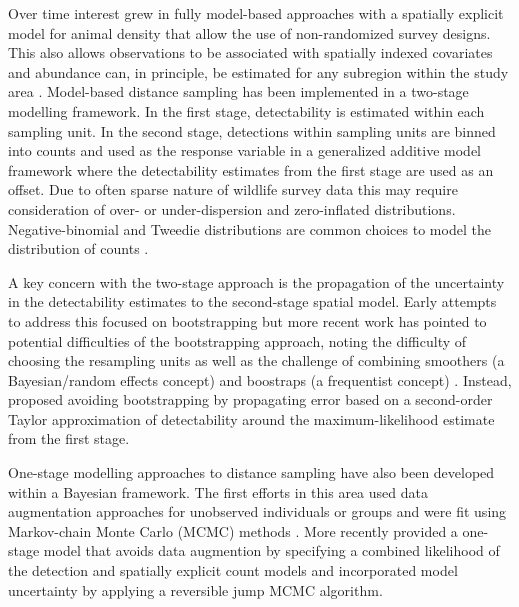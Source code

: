 \documentclass[preprint,12pt]{elsarticle}
\begin{document}
Over time interest grew in fully model-based approaches with a spatially explicit model for animal density that allow the use of non-randomized survey designs.  This also allows observations to be associated with spatially indexed covariates and abundance can, in principle, be estimated for any subregion within the study area \citep{johnson_model-based_2010, miller_spatial_2013, buckland_model-based_2016}.  
Model-based distance sampling has been implemented in a two-stage modelling framework.  In the first stage, detectability is estimated within each sampling unit.  In the second stage, detections within sampling units are binned into counts and used as the response variable in a generalized additive model framework where the detectability estimates from the first stage are used as an offset.  Due to often sparse nature of wildlife survey data this may require consideration of over- or under-dispersion and zero-inflated distributions.  Negative-binomial and Tweedie distributions are common choices to model the distribution of counts \citep{wood_gam_2017}.

A key concern with the two-stage approach is the propagation of the uncertainty in the detectability estimates to the second-stage spatial model.  Early attempts to address this focused on bootstrapping \citep{lahiri_resampling_2003, hedley_spatial_2004} but more recent work has pointed to potential difficulties of the bootstrapping approach, noting the difficulty of choosing the resampling units as well as the challenge of combining smoothers (a Bayesian/random effects concept) and boostraps (a frequentist concept) \citep{bravington_reliable_2018-1}. Instead, \cite{bravington_reliable_2018-1}  proposed avoiding bootstrapping by propagating error based on a second-order Taylor approximation of detectability around the maximum-likelihood estimate from the first stage.

One-stage modelling approaches to distance sampling have also been developed within a Bayesian framework.  The first efforts in this area used data augmentation approaches for unobserved individuals or groups and were fit using Markov-chain Monte Carlo (MCMC) methods \citep{royle_hierarchical_2008, schmidt_using_2012}.  More recently  \cite{oedekoven_bayesian_2014} provided a one-stage model that avoids data augmention by specifying a combined likelihood of the detection and spatially explicit count models and incorporated model uncertainty by applying a reversible jump MCMC algorithm.
\end{document}
